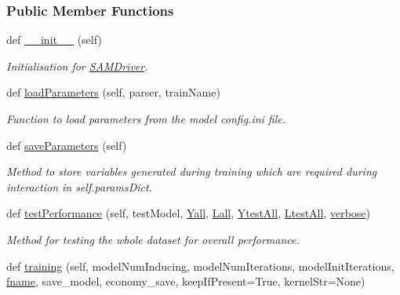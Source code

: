 \subsubsection*{Public Member Functions}
\begin{DoxyCompactItemize}
\item 
def \hyperlink{group__icubclient__SAM__Drivers_gac35ec3eea80d1fb5704758a9c53267a1}{\+\_\+\+\_\+init\+\_\+\+\_\+} (self)
\begin{DoxyCompactList}\small\item\em Initialisation for \hyperlink{group__icubclient__SAM__Drivers_classSAM_1_1SAM__Core_1_1SAMDriver_1_1SAMDriver}{S\+A\+M\+Driver}. \end{DoxyCompactList}\item 
def \hyperlink{group__icubclient__SAM__Drivers_gaa44829106cbdec9d9548151582908dce}{load\+Parameters} (self, parser, train\+Name)
\begin{DoxyCompactList}\small\item\em Function to load parameters from the model config.\+ini file. \end{DoxyCompactList}\item 
def \hyperlink{group__icubclient__SAM__Drivers_gac6f300d2daf748b11b28802574b6f5e8}{save\+Parameters} (self)
\begin{DoxyCompactList}\small\item\em Method to store variables generated during training which are required during interaction in self.\+params\+Dict. \end{DoxyCompactList}\item 
def \hyperlink{group__icubclient__SAM__Drivers_ga282ca575179c9374f26da33269b14ea7}{test\+Performance} (self, test\+Model, \hyperlink{group__icubclient__SAM__Drivers_ga99651a34f71273b720039e8f4d4b03a4}{Yall}, \hyperlink{group__icubclient__SAM__Drivers_ga4b259685c2b7fddfc554f75eee45389a}{Lall}, \hyperlink{group__icubclient__SAM__Drivers_ga61bc4612a1dd3b5d593798bb7e338c81}{Ytest\+All}, \hyperlink{group__icubclient__SAM__Drivers_ga47bb2e79cf8b5f8e071ab6208cf25dd0}{Ltest\+All}, \hyperlink{group__icubclient__SAM__Drivers_ga48cfefc6532ba606936b9fd7f3156da8}{verbose})
\begin{DoxyCompactList}\small\item\em Method for testing the whole dataset for overall performance. \end{DoxyCompactList}\item 
def \hyperlink{group__icubclient__SAM__Drivers_ga35c70890b650a03a8da39b87c1de39d7}{training} (self, model\+Num\+Inducing, model\+Num\+Iterations, model\+Init\+Iterations, \hyperlink{group__icubclient__SAM__Drivers_ga1095171ae626372dde87a71f9d9263ce}{fname}, save\+\_\+model, economy\+\_\+save, keep\+If\+Present=True, kernel\+Str=None)

\end{DoxyCompactItemize}
